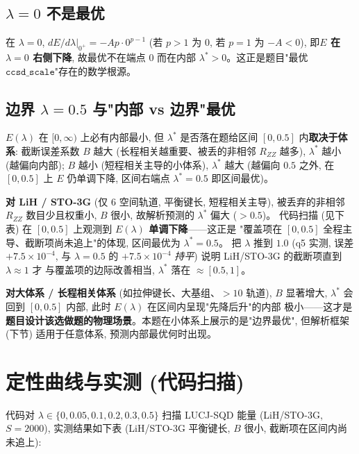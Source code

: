 \documentclass[11pt]{article}
\begin{document}
\subsection*{$\lambda=0$ 不是最优}
在 $\lambda=0$, $dE/d\lambda|_{0^+}=-Ap\cdot 0^{p-1}$ (若 $p>1$ 为 $0$, 若 $p=1$ 为
$-A<0$), 即\textbf{$E$ 在 $\lambda=0$ 右侧下降}, 故最优不在端点 $0$ 而在内部
$\lambda^\ast>0$。这正是题目"最优 $\texttt{ccsd\_scale}$"存在的数学根源。

\subsection*{边界 $\lambda=0.5$ 与"内部 vs 边界"最优}
$E(\lambda)$ 在 $[0,\infty)$ 上必有内部最小, 但 $\lambda^\ast$ 是否落在题给区间
$[0,0.5]$ 内\textbf{取决于体系}: 截断误差系数 $B$ 越大 (长程相关越重要、被丢的非相邻
$R_{ZZ}$ 越多), $\lambda^\ast$ 越小 (越偏向内部); $B$ 越小 (短程相关主导的小体系),
$\lambda^\ast$ 越大 (越偏向 $0.5$ 之外, 在 $[0,0.5]$ 上 $E$ 仍单调下降, 区间右端点
$\lambda^\ast=0.5$ 即区间最优)。

\textbf{对 LiH / STO-3G} (仅 6 空间轨道, 平衡键长, 短程相关主导), 被丢弃的非相邻
$R_{ZZ}$ 数目少且权重小, $B$ 很小, 故解析预测的 $\lambda^\ast$ 偏大 ($>0.5$)。
代码扫描 (见下表) 在 $[0,0.5]$ 上观测到 \textbf{$E(\lambda)$ 单调下降}——这正是
"覆盖项在 $[0,0.5]$ 全程主导、截断项尚未追上"的体现, 区间最优为 $\lambda^\ast=0.5$。
把 $\lambda$ 推到 $1.0$ (q5 实测, 误差 $+7.5{\times}10^{-4}$, 与 $\lambda{=}0.5$ 的
$+7.5{\times}10^{-4}$ \emph{持平}) 说明 LiH/STO-3G 的截断项直到 $\lambda\approx 1$ 才
与覆盖项的边际改善相当, $\lambda^\ast$ 落在 $\approx[0.5,1]$。

\textbf{对大体系 / 长程相关体系} (如拉伸键长、大基组、$>10$ 轨道), $B$ 显著增大,
$\lambda^\ast$ 会回到 $[0,0.5]$ 内部, 此时 $E(\lambda)$ 在区间内呈现"先降后升"的内部
极小——这才是\textbf{题目设计该选做题的物理场景}。本题在小体系上展示的是"边界最优",
但解析框架 (下节) 适用于任意体系, 预测内部最优何时出现。

\section{定性曲线与实测 (代码扫描)}
代码对 $\lambda\in\{0,0.05,0.1,0.2,0.3,0.5\}$ 扫描 LUCJ-SQD 能量 (LiH/STO-3G,
$S=2000$), 实测结果如下表 (LiH/STO-3G 平衡键长, $B$ 很小, 截断项在区间内尚未追上):
\end{document}

